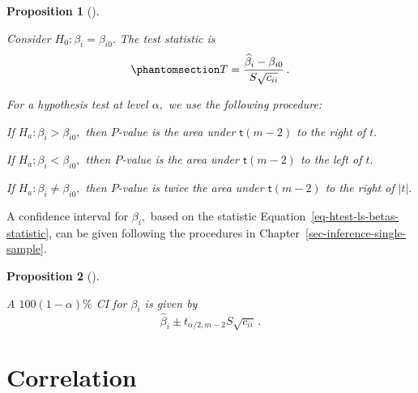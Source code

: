 \documentclass[
  a4paper,
  DIV=11,
  numbers=noendperiod,
  oneside]{scrreprt}
\theoremstyle{plain}
\theoremstyle{definition}
\theoremstyle{definition}
\theoremstyle{definition}
\theoremstyle{plain}
\newtheorem{proposition}{Proposition}[chapter]
\theoremstyle{remark}
\begin{document}
\begin{proposition}[]\protect\hypertarget{prp-htest-ls-betas}{}\label{prp-htest-ls-betas}

Consider \(H_0 : \beta_i = \beta_{i0}.\) The test statistic is
\begin{equation}\phantomsection\label{eq-htest-ls-betas-statistic}{
 T = \frac{\widehat{\beta}_i - \beta_{i0}}{S\sqrt{c_{ii}}} \,.
}\end{equation}

For a hypothesis test at level \(\alpha,\) we use the following
procedure:

If \(H_a : \beta_i > \beta_{i0},\) then \(P\)-value is the area under
\(\mathsf{t}(m-2)\) to the right of \(t.\)

If \(H_a : \beta_i < \beta_{i0},\) tthen \(P\)-value is the area under
\(\mathsf{t}(m-2)\) to the left of \(t.\)

If \(H_a : \beta_i \neq \beta_{i0},\) then \(P\)-value is twice the area
under \(\mathsf{t}(m-2)\) to the right of \(|t|.\)

\end{proposition}

A confidence interval for \(\beta_i,\) based on the statistic
Equation~\ref{eq-htest-ls-betas-statistic}, can be given following the
procedures in Chapter~\ref{sec-inference-single-sample}.

\begin{proposition}[]\protect\hypertarget{prp-ci-ls-betas}{}\label{prp-ci-ls-betas}

A \(100(1-\alpha)\%\) CI for \(\beta_i\) is given by \[
 \widehat{\beta}_i \pm t_{\alpha/2, m-2} S \sqrt{c_{ii}} \,.
\]

\end{proposition}

\section{Correlation}\label{sec-correlation}
\end{document}

